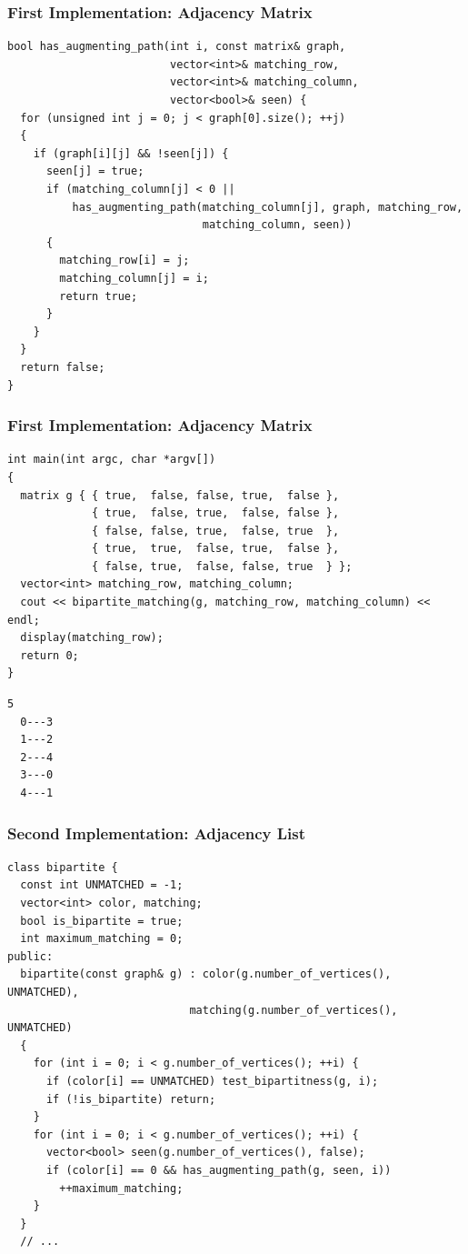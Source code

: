 \documentclass{beamer}
\begin{document}
\begin{frame}[containsverbatim]
\frametitle{First Implementation: Adjacency Matrix}
\scriptsize

\begin{lstlisting}
bool has_augmenting_path(int i, const matrix& graph,
                         vector<int>& matching_row,
                         vector<int>& matching_column,
                         vector<bool>& seen) {
  for (unsigned int j = 0; j < graph[0].size(); ++j)
  {
    if (graph[i][j] && !seen[j]) {
      seen[j] = true;
      if (matching_column[j] < 0 ||
          has_augmenting_path(matching_column[j], graph, matching_row,
                              matching_column, seen))
      {
        matching_row[i] = j;
        matching_column[j] = i;
        return true;
      }
    }
  }
  return false;
}
\end{lstlisting}

\end{frame}

\begin{frame}[containsverbatim]
\frametitle{First Implementation: Adjacency Matrix}
\scriptsize

\begin{lstlisting}
int main(int argc, char *argv[])
{
  matrix g { { true,  false, false, true,  false },
             { true,  false, true,  false, false },
             { false, false, true,  false, true  },
             { true,  true,  false, true,  false },
             { false, true,  false, false, true  } };
  vector<int> matching_row, matching_column;
  cout << bipartite_matching(g, matching_row, matching_column) << endl;
  display(matching_row);
  return 0;
}
\end{lstlisting}

\begin{verbatim}
5
  0---3
  1---2
  2---4
  3---0
  4---1
\end{verbatim}

\end{frame}

\begin{frame}[containsverbatim]
\frametitle{Second Implementation: Adjacency List}
\scriptsize

\begin{lstlisting}
class bipartite {
  const int UNMATCHED = -1;
  vector<int> color, matching;
  bool is_bipartite = true;
  int maximum_matching = 0;
public:
  bipartite(const graph& g) : color(g.number_of_vertices(), UNMATCHED),
                            matching(g.number_of_vertices(), UNMATCHED)
  {
    for (int i = 0; i < g.number_of_vertices(); ++i) {
      if (color[i] == UNMATCHED) test_bipartitness(g, i);
      if (!is_bipartite) return;
    }
    for (int i = 0; i < g.number_of_vertices(); ++i) {
      vector<bool> seen(g.number_of_vertices(), false);
      if (color[i] == 0 && has_augmenting_path(g, seen, i))
        ++maximum_matching;
    }
  }
  // ...
\end{lstlisting}

\end{frame}
\end{document}
